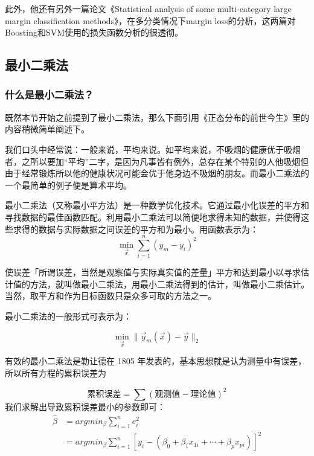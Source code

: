 \documentclass[a4paper,12pt]{article}
\begin{document}
此外，他还有另外一篇论文《Statistical analysis of some multi-category large margin classification methods》，在多分类情况下margin loss的分析，这两篇对Boosting和SVM使用的损失函数分析的很透彻。

\subsection{最小二乘法}
\subsubsection{什么是最小二乘法？}
既然本节开始之前提到了最小二乘法，那么下面引用《正态分布的前世今生》里的内容稍微简单阐述下。

我们口头中经常说：一般来说，平均来说。如平均来说，不吸烟的健康优于吸烟者，之所以要加“平均”二字，是因为凡事皆有例外，总存在某个特别的人他吸烟但由于经常锻炼所以他的健康状况可能会优于他身边不吸烟的朋友。而最小二乘法的一个最简单的例子便是算术平均。

最小二乘法（又称最小平方法）是一种数学优化技术。它通过最小化误差的平方和寻找数据的最佳函数匹配。利用最小二乘法可以简便地求得未知的数据，并使得这些求得的数据与实际数据之间误差的平方和为最小。用函数表示为：
\begin{equation}
  \min_{\vec x}\sum_{i=1}^n(y_m-y_i)^2
\end{equation}

使误差「所谓误差，当然是观察值与实际真实值的差量」平方和达到最小以寻求估计值的方法，就叫做最小二乘法，用最小二乘法得到的估计，叫做最小二乘估计。当然，取平方和作为目标函数只是众多可取的方法之一。

最小二乘法的一般形式可表示为：

\begin{equation}
  \min_{\vec x}\|\vec y_{m}(\vec x)-\vec y\|_2
\end{equation}

有效的最小二乘法是勒让德在 1805 年发表的，基本思想就是认为测量中有误差，所以所有方程的累积误差为

\begin{equation}
  \text{累积误差}=\sum(\text{观测值}-\text{理论值})^2
\end{equation}
我们求解出导致累积误差最小的参数即可：
\begin{equation}
  \begin{split}
    \widehat\beta &= argmin_\beta\sum_{i=1}^ne_i^2\\
    &= argmin_\beta\sum_{i=1}^n[y_i-(\beta_0+\beta_1x_{1i}+\cdots+\beta_px_{pi})]^2
  \end{split}
\end{equation}
\end{document}
